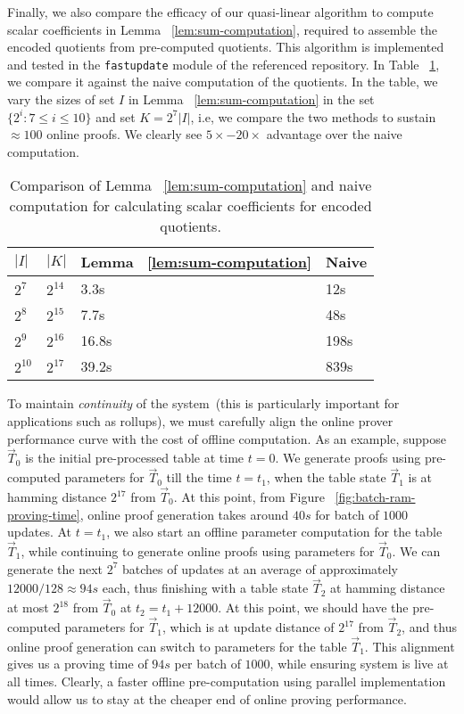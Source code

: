 Finally, we also compare the efficacy of our quasi-linear algorithm to compute scalar coefficients in
Lemma ~\ref{lem:sum-computation}, required to assemble the encoded quotients from pre-computed quotients.
This algorithm is implemented and tested in the {\tt fastupdate} module of the referenced repository.
In Table ~\ref{tbl:sum-computation-compare}, we compare it against the naive computation of the quotients.
In the table, we vary the sizes of set $I$ in Lemma ~\ref{lem:sum-computation} in the set $\{2^i:7\leq i\leq 10\}$
and set $K=2^7|I|$, i.e, we compare the two methods to sustain $\approx 100$ online proofs. We clearly see
$5\times-20\times$ advantage over the naive computation.

\begin{table}[htbp]
    \centering
    \begin{tabularx}{0.45\textwidth}{@{}XXXX@{}}
        \toprule
         $|I|$ & $|K|$ & Lemma ~\ref{lem:sum-computation} & Naive \\ \midrule
        $2^7$ & $2^{14}$ & 3.3s  & 12s \\
        $2^8$ & $2^{15}$ & 7.7s  & 48s \\
        $2^9$ & $2^{16}$ & 16.8s & 198s \\
        $2^{10}$ & $2^{17}$ & 39.2s & 839s \\
        \bottomrule
    \end{tabularx}
    \caption{Comparison of Lemma ~\ref{lem:sum-computation} and naive computation for calculating
    scalar coefficients for encoded quotients.}
    \label{tbl:sum-computation-compare}
\end{table}

\smallskip

 To maintain {\em continuity} of the system~(this is particularly important for applications such as rollups), we must carefully
align the online prover performance curve with the cost of offline computation.  As an example, suppose $\vec{T}_0$
is the initial pre-processed table at time $t=0$. We generate proofs using pre-computed parameters for $\vec{T}_0$
till the time $t=t_1$, when the table state $\vec{T}_1$ is at hamming distance $2^{17}$ from $\vec{T}_0$. At this point,
from Figure ~\ref{fig:batch-ram-proving-time}, online proof generation takes around $40s$ for batch of $1000$ updates.
At $t=t_1$, we also start an offline parameter computation for the table $\vec{T}_1$, while continuing to generate
online proofs using parameters for $\vec{T}_0$. We can generate the next $2^7$ batches of updates at an average of
approximately $12000/128\approx 94s$ each, thus finishing with a table state $\vec{T}_2$ at hamming distance at most
$2^{18}$ from $\vec{T}_0$ at $t_2=t_1+12000$. At this point, we should have the pre-computed parameters for $\vec{T}_1$,
which is at update distance of $2^{17}$ from $\vec{T}_2$, and thus online proof generation can switch to parameters
for the table $\vec{T}_1$. This alignment gives us a proving time of $94s$ per batch of $1000$, while ensuring system
is live at all times. Clearly, a faster offline pre-computation using parallel implementation would allow us to stay
at the cheaper end of online proving performance.



